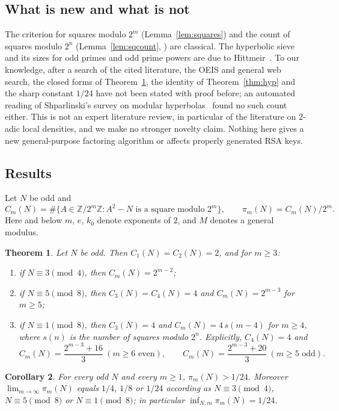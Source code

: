 \documentclass[11pt]{amsart}
\newtheorem{theorem}{Theorem}
\newtheorem{corollary}[theorem]{Corollary}
\theoremstyle{remark}
\newcommand{\Z}{\mathbb{Z}}
\begin{document}
\subsection*{What is new and what is not}
The criterion for squares modulo $2^m$ (Lemma~\ref{lem:squares}) and the count of squares modulo $2^n$ (Lemma~\ref{lem:sqcount}, \cite{stangl}) are classical. The hyperbolic sieve and its sizes for odd primes and odd prime powers are due to Hittmeir~\cite{hittmeir2023}. To our knowledge, after a search of the cited literature, the OEIS and general web search, the closed forms of Theorem~\ref{thm:main}, the identity of Theorem~\ref{thm:hyp} and the sharp constant $1/24$ have not been stated with proof before; an automated reading of Shparlinski's survey on modular hyperbolas~\cite{shparlinski} found no such count either. This is not an expert literature review, in particular of the literature on $2$-adic local densities, and we make no stronger novelty claim. Nothing here gives a new general-purpose factoring algorithm or affects properly generated RSA keys.

\subsection*{Results}
Let $N$ be odd and
\[
C_m(N)=\#\{A\in\Z/2^m\Z : A^2-N \text{ is a square modulo } 2^m\},\qquad \pi_m(N)=C_m(N)/2^m .
\]
Here and below $m$, $e$, $k_0$ denote exponents of $2$, and $M$ denotes a general modulus.

\begin{theorem}\label{thm:main}
Let $N$ be odd. Then $C_1(N)=C_2(N)=2$, and for $m\ge3$:
\begin{enumerate}
\item if $N\equiv3\pmod4$, then $C_m(N)=2^{m-2}$;
\item if $N\equiv5\pmod8$, then $C_3(N)=C_4(N)=4$ and $C_m(N)=2^{m-3}$ for $m\ge5$;
\item if $N\equiv1\pmod8$, then $C_3(N)=4$ and $C_m(N)=4\,s(m-4)$ for $m\ge4$, where $s(n)$ is the number of squares modulo $2^n$. Explicitly, $C_4(N)=4$ and
\[
C_m(N)=\frac{2^{m-3}+16}{3}\ (m\ge6\text{ even}),\qquad C_m(N)=\frac{2^{m-3}+20}{3}\ (m\ge5\text{ odd}).
\]
\end{enumerate}
\end{theorem}

\begin{corollary}\label{cor:density}
For every odd $N$ and every $m\ge1$, $\pi_m(N)>1/24$. Moreover $\lim_{m\to\infty}\pi_m(N)$ equals $1/4$, $1/8$ or $1/24$ according as $N\equiv3\pmod4$, $N\equiv5\pmod8$ or $N\equiv1\pmod8$; in particular $\inf_{N,m}\pi_m(N)=1/24$.
\end{corollary}
\end{document}
